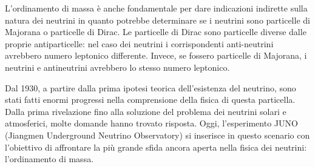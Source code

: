 L'ordinamento di massa è anche fondamentale per dare indicazioni indirette sulla natura dei neutrini in quanto potrebbe determinare se i neutrini sono particelle di Majorana o particelle di Dirac. Le particelle di Dirac sono particelle diverse dalle proprie antiparticelle: nel caso dei neutrini i corrispondenti anti-neutrini avrebbero numero leptonico differente. Invece, se fossero particelle di Majorana, i neutrini e antineutrini avrebbero lo stesso numero leptonico.


Dal 1930, a partire dalla prima ipotesi teorica dell'esistenza del neutrino, sono stati fatti enormi progressi nella comprensione della fisica di questa particella. Dalla prima rivelazione fino alla soluzione del problema dei neutrini solari e atmosferici, molte domande hanno trovato risposta. Oggi, l'esperimento JUNO (Jiangmen Underground Neutrino Observatory) si inserisce in questo scenario con l'obiettivo di affrontare la più grande sfida ancora aperta nella fisica dei neutrini: l'ordinamento di massa.
\newpage